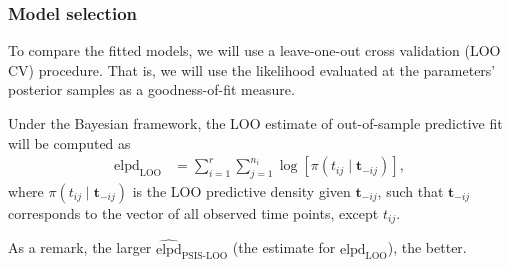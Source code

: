 \documentclass[10pt, aspectratio = 169, handout]{beamer} %
\begin{document}
    \begin{frame}[t]
		\frametitle{Model selection}
		\justifying

        To compare the fitted models, we will use a leave-one-out cross validation (LOO CV) procedure. That is, we will use the likelihood evaluated at the parameters' posterior samples as a goodness-of-fit measure.

        \vspace{5pt}
        
        Under the Bayesian framework, the LOO estimate of out-of-sample predictive fit will be computed as
        \begin{align*}
            \text{elpd}_{\text{LOO}} &= \sum_{i = 1}^{r}\sum_{j = 1}^{n_i} \log\left[\pi(t_{ij}\mid\mathbf{t}_{-{ij}})\right],
        \end{align*}
        where $\pi(t_{ij} \mid \mathbf{t}_{-{ij}})$ is the LOO predictive density given $\mathbf{t}_{-ij}$, such that $\mathbf{t}_{-ij}$ corresponds to the vector of all observed time points, except $t_{ij}$. 

        \vspace{5pt}
        
        As a remark, the larger $\widehat{\text{elpd}}_{\text{PSIS-LOO}}$ (the estimate for $\text{elpd}_{\text{LOO}}$), the better.

	\end{frame}
\end{document}
